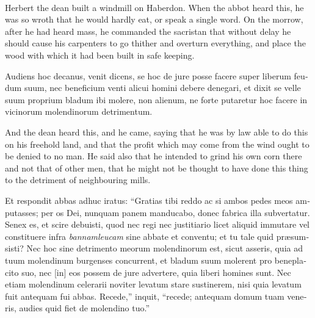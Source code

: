 \documentclass[10pt]{book}
\newcounter{engnote}
\newcommand{\engnotenum}{\textsuperscript{\arabic{engnote}\stepcounter{engnote}}}
\begin{document}
\begin{paracol}{2}
\begin{otherlanguage}{latin}
\end{otherlanguage}

\switchcolumn

Herbert the dean\engnotenum{} built a windmill on Haberdon.\engnotenum{} When the abbot heard this, he was so wroth that he would hardly eat, or speak a single word. On the morrow, after he had heard mass, he commanded the sacristan that without delay he should cause his carpenters to go thither and overturn everything, and place the wood with which it had been built in safe keeping.

\switchcolumn*

\begin{otherlanguage}{latin}
Audiens hoc decanus, venit dicens, se hoc de jure posse facere super liberum feudum suum, nec beneficium venti alicui homini debere denegari, et dixit se velle suum proprium bladum ibi molere, non alienum, ne forte putaretur hoc facere in vicinorum molendinorum detrimentum.
\end{otherlanguage}

\switchcolumn

And the dean heard this, and he came, saying that he was by law able to do this on his freehold land, and that the profit which may come from the wind ought to be denied to no man. He said also that he intended to grind his own corn there and not that of other men, that he might not be thought to have done this thing to the detriment of neighbouring mills.

\switchcolumn*

\begin{otherlanguage}{latin}
Et respondit abbas adhuc iratus: ``Gratias tibi reddo ac si ambos pedes meos amputasses; per os Dei, nunquam panem manducabo, donec fabrica illa subvertatur. Senex es, et scire debuisti, quod nec regi nec justitiario licet aliquid immutare vel constituere infra \emph{bannamleucam} sine abbate et conventu; et tu tale quid pr\ae{}sumsisti? Nec hoc sine detrimento meorum molendinorum est, sicut asseris, quia ad tuum molendinum burgenses concurrent, et bladum suum molerent pro beneplacito suo, nec [in] eos possem de jure advertere, quia liberi homines sunt. Nec etiam molendinum celerarii noviter levatum stare sustinerem, nisi quia levatum fuit antequam fui abbas. Recede,'' inquit, ``recede; antequam domum tuam veneris, audies quid fiet de molendino tuo.''
\end{otherlanguage}

\switchcolumn


\end{paracol}
\end{document}
